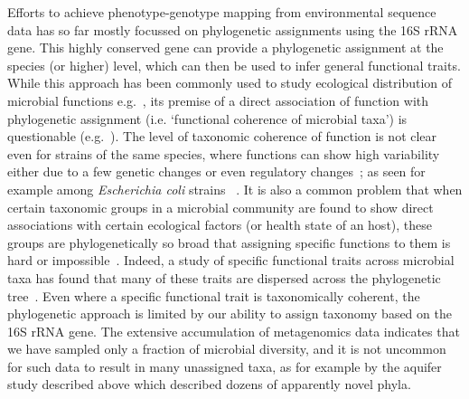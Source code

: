 \documentclass[10pt,letterpaper]{article}
\begin{document}
Efforts to achieve phenotype-genotype mapping from environmental sequence data has so far mostly focussed on phylogenetic assignments using the 16S rRNA gene. This highly conserved
gene can provide a phylogenetic assignment at the species (or higher) level, which can then be used to infer general functional traits. While this approach has been commonly used to study ecological distribution of microbial functions e.g.~\cite{Philippot2009,Louca2016a,Louca2016b}, its premise of a direct association of function with phylogenetic assignment (i.e.
‘functional coherence of microbial taxa’) is questionable (e.g.~\cite{Philippot2010}).
The level of taxonomic coherence of function is not clear even for strains of the same species,
where functions can show high variability either due to a few genetic changes or even
regulatory changes~\cite{Martiny2015}; as seen for example among \emph{Escherichia coli} strains ~\cite{Sabarly2011}. It
is also a common problem that when certain taxonomic groups in a microbial community are
found to show direct associations with certain ecological factors (or health state of an host),
these groups are phylogenetically so broad that assigning specific functions to them is hard or impossible~\cite{Koeppel2012}. Indeed, a study of specific functional traits
across microbial taxa has found that many of these traits are dispersed across the
phylogenetic tree~\cite{Martiny2015,Martiny2013}. Even where a specific functional trait is taxonomically coherent, the
phylogenetic approach is limited by our ability to assign taxonomy based on the 16S rRNA gene. The extensive accumulation of metagenomics data indicates that we have sampled only a fraction of microbial diversity, and it is not uncommon for such data to result in many
unassigned taxa, as for example by the aquifer study described above which described dozens of apparently novel phyla.
\end{document}
